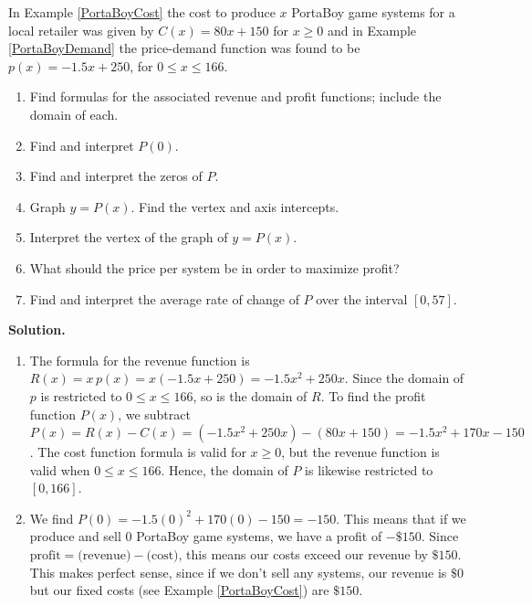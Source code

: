 \begin{ex}  \label{PortaBoyProfit}  In Example \ref{PortaBoyCost} the cost to produce $x$ PortaBoy game systems for a local retailer was given by $C(x) = 80x + 150$ for $x \geq 0$ and in Example \ref{PortaBoyDemand} the price-demand function was found to be $p(x) = -1.5x+250$, for $0 \leq x \leq 166$.

\begin{enumerate}

\item  Find formulas for the associated revenue and profit functions;   include the domain of each.

\item Find and interpret $P(0)$.

\item  Find and interpret the zeros of $P$.

\item  Graph $y = P(x)$. Find the vertex and axis intercepts.

\item  Interpret the vertex of the graph of $y = P(x)$.

\item What should the price per system be in order to maximize profit?

\item Find and interpret the average rate of change of $P$ over the interval $[0, 57]$.

\end{enumerate}

{\bf Solution.}  

\begin{enumerate}

\item  The formula for the revenue function is $R(x) = x \, p(x) = x(-1.5x+250) = -1.5x^2 + 250x$. Since the domain of $p$ is restricted to  $0 \leq x \leq 166$, so is the domain of $R$.    To find the profit function $P(x)$, we subtract $P(x) = R(x) - C(x) = \left(-1.5x^2+250x\right) - \left(80x + 150\right) = -1.5x^2+170x-150$.    The cost function formula is valid for $x \geq 0$, but the revenue function is valid when $0 \leq x \leq 166$.  Hence, the domain of $P$ is likewise restricted to $[0, 166]$. 

\item We find $P(0) = -1.5(0)^2+170(0) - 150 = -150$.  This means that if we produce and sell $0$ PortaBoy game systems, we have a profit of $- \$ 150$.  Since $\text{profit} = \text{(revenue)} - \text{(cost)}$, this means our costs exceed our revenue by $\$150$. This makes perfect sense, since if we don't sell any systems, our revenue is $\$0$ but our fixed costs (see Example  \ref{PortaBoyCost}) are $\$150$.


\end{enumerate}
\end{ex}
